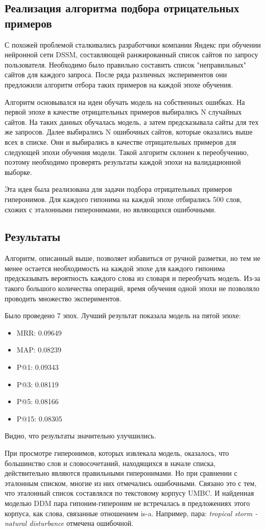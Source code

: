 \subsection{Реализация алгоритма подбора отрицательных примеров}

С похожей проблемой сталкивались разработчики компании Яндекс при обучении нейронной сети DSSM, составляющей ранжированный список сайтов по запросу пользователя. Необходимо было правильно составить список "неправильных" сайтов для каждого запроса. После ряда различных экспериментов они предложили алгоритм отбора таких примеров на каждой эпохе обучения. 

Алгоритм основывался на идеи обучать модель на собственных ошибках. На первой эпохе в качестве отрицательных примеров выбирались N случайных сайтов. На таких данных обучалась модель, а затем предсказывала сайты для тех же запросов. Далее выбирались N ошибочных сайтов, которые оказались выше всех в списке. Они и выбирались в качестве отрицательных примеров для следующей эпохи обучения модели. Такой алгоритм склонен к переобучению, поэтому необходимо проверять результаты каждой эпохи на валидационной выборке. 

Эта идея была реализована для задачи подбора отрицательных примеров гиперонимов. Для каждого гипонима на каждой эпохе отбирались 500 слов, схожих с эталонными гиперонимами, но являющихся ошибочными.

\subsection{Результаты}

Алгоритм, описанный выше, позволяет избавиться от ручной разметки, но тем не менее остается необходимость на каждой эпохе для каждого гипонима предсказывать вероятность каждого слова из словаря и переобучать модель. Из-за такого большого количества операций, время обучения одной эпохи не позволяло проводить множество экспериментов. 

Было проведено 7 эпох. Лучший результат показала модель на пятой эпохе:

\begin{itemize}
\item MRR: 0.09649
\item MAP: 0.08239
\item P@1: 0.09343
\item P@3: 0.08119
\item P@5: 0.08166
\item P@15: 0.08305
\end{itemize}

Видно, что результаты значительно улучшились. 

При просмотре гиперонимов, которых извлекала модель, оказалось, что большинство слов и словосочетаний, находящихся в начале списка, действительно являются правильными гиперонимами. Но при сравнении с эталонным списком, многие из них отмечались ошибочными. Связано это с тем, что эталонный список составлялся по текстовому корпусу UMBC. И найденная моделью DDM пара гипоним-гипероним не встречалась в предложениях этого корпуса, как слова, связанные отношением is-a. Например, пара: \textit{tropical storm - natural disturbance} отмечена ошибочной.

